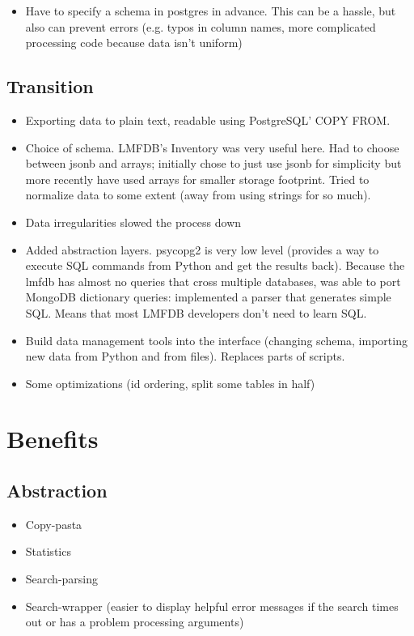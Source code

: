 \documentclass{article}
\begin{document}
\begin{itemize}
 \item Have to specify a schema in postgres in advance.  This can be a hassle, but also can prevent errors (e.g. typos in column names, more complicated processing code because data isn't uniform)
\end{itemize}

\subsection{Transition}

\begin{itemize}
\item Exporting data to plain text, readable using PostgreSQL' COPY FROM.
\item Choice of schema.  LMFDB's Inventory was very useful here.  Had to choose between jsonb and arrays; initially chose to just use jsonb for simplicity but more recently have used arrays for smaller storage footprint.  Tried to normalize data to some extent (away from using strings for so much). 
\item Data irregularities slowed the process down
\item Added abstraction layers.  psycopg2 is very low level (provides a way to execute SQL commands from Python and get the results back).  Because the lmfdb has almost no queries that cross multiple databases, was able to port MongoDB dictionary queries: implemented a parser that generates simple SQL.  Means that most LMFDB developers don't need to learn SQL.
\item Build data management tools into the interface (changing schema, importing new data from Python and from files).  Replaces parts of scripts.
\item Some optimizations (id ordering, split some tables in half)
\end{itemize}

\section{Benefits}

\subsection{Abstraction}

\begin{itemize}
\item Copy-pasta
\item Statistics
\item Search-parsing
\item Search-wrapper (easier to display helpful error messages if the search times out or has a problem processing arguments)
\end{itemize}
\end{document}
